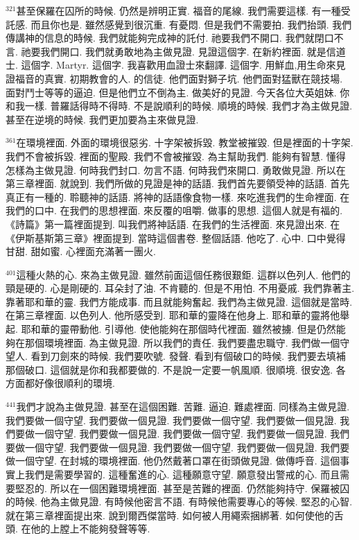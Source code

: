 \documentclass{book}
\begin{document}
$^{321}$甚至保羅在囚所的時候.
仍然是辨明正實.
福音的尾線.
我們需要這樣.
有一種受託感.
而且你也是.
雖然感覺到很沉重.
有憂悶.
但是我們不需要拍.
我們抬頭.
我們傳講神的信息的時候.
我們就能夠完成神的託付.
祂要我們不開口.
我們就閉口不言.
祂要我們開口.
我們就勇敢地為主做見證.
見證這個字.
在新約裡面.
就是信道士.
這個字.
Martyr.
這個字.
我喜歡用血證士來翻譯.
這個字.
用鮮血,用生命來見證福音的真實.
初期教會的人.
的信徒.
他們面對獅子坑.
他們面對猛獸在競技場.
面對鬥士等等的逼迫.
但是他們立不倒為主.
做美好的見證.
今天各位大英姐妹.
你和我一樣.
普羅話得時不得時.
不是說順利的時候.
順境的時候.
我們才為主做見證.
甚至在逆境的時候.
我們更加要為主來做見證.

$^{361}$在環境裡面.
外面的環境很惡劣.
十字架被拆毀.
教堂被摧毀.
但是裡面的十字架.
我們不會被拆毀.
裡面的聖殿.
我們不會被摧毀.
為主幫助我們.
能夠有智慧.
懂得怎樣為主做見證.
何時我們封口.
勿言不語.
何時我們來開口.
勇敢做見證.
所以在第三章裡面.
就說到.
我們所做的見證是神的話語.
我們首先要領受神的話語.
首先真正有一種的.
聆聽神的話語.
將神的話語像食物一樣.
來吃進我們的生命裡面.
在我們的口中.
在我們的思想裡面.
來反覆的咀嚼.
做事的思想.
這個人就是有福的.
《詩篇》第一篇裡面提到.
叫我們將神話語.
在我們的生活裡面.
來見證出來.
在《伊斯基斯第三章》裡面提到.
當時這個書卷.
整個話語.
他吃了.
心中.
口中覺得甘甜.
甜如蜜.
心裡面充滿著一團火.

$^{401}$這種火熱的心.
來為主做見證.
雖然前面這個任務很艱鉅.
這群以色列人.
他們的頸是硬的.
心是剛硬的.
耳朵封了油.
不肯聽的.
但是不用怕.
不用憂戚.
我們靠著主.
靠著耶和華的靈.
我們方能成事.
而且就能夠奮起.
我們為主做見證.
這個就是當時.
在第三章裡面.
以色列人.
他所感受到.
耶和華的靈降在他身上.
耶和華的靈將他舉起.
耶和華的靈帶動他.
引導他.
使他能夠在那個時代裡面.
雖然被擄.
但是仍然能夠在那個環境裡面.
為主做見證.
所以我們的責任.
我們要盡忠職守.
我們做一個守望人.
看到刀劍來的時候.
我們要吹號.
發聲.
看到有個破口的時候.
我們要去填補那個破口.
這個就是你和我都要做的.
不是說一定要一帆風順.
很順境.
很安逸.
各方面都好像很順利的環境.

$^{441}$我們才說為主做見證.
甚至在這個困難.
苦難.
逼迫.
難處裡面.
同樣為主做見證.
我們要做一個守望.
我們要做一個見證.
我們要做一個守望.
我們要做一個見證.
我們要做一個守望.
我們要做一個見證.
我們要做一個守望.
我們要做一個見證.
我們要做一個守望.
我們要做一個見證.
我們要做一個守望.
我們要做一個見證.
我們要做一個守望.
在封城的環境裡面.
他仍然戴著口罩在街頭做見證.
做傳呼音.
這個事實上我們是需要學習的.
這種奮進的心.
這種願意守望.
願意發出警戒的心.
而且需要堅忍的.
所以在一個困難環境裡面.
甚至是苦難的裡面.
仍然能夠持守.
保羅被囚的時候.
他為主做見證.
有時候他密言不語.
有時候他需要專心的等候.
堅忍的心智.
就在第三章裡面提出來.
說到爾西傑當時.
如何被人用繩索捆綁著.
如何使他的舌頭.
在他的上膛上不能夠發聲等等.
\end{document}
